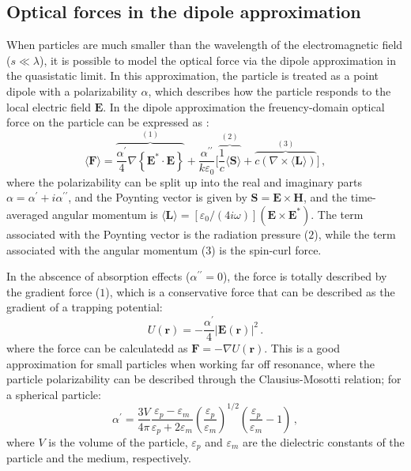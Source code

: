 \subsection*{Optical forces in the dipole approximation \cite{ownpub1}}

When particles are much smaller than the wavelength of the electromagnetic field ($s\ll \lambda$), it is possible to model the optical force via the dipole approximation in the
quasistatic limit. In this approximation, the particle is treated as a point dipole with a polarizability $\alpha$, which describes how the particle responds to the local electric field $\mathbf{E}$.
In the dipole approximation the freuency-domain optical force on the particle can be expressed as \cite{novotny}:
\begin{equation}
    \langle\mathbf{F}\rangle=\overbrace{\frac{\alpha^{\prime}}{4} \nabla\left\{\mathbf{E}^* \cdot \mathbf{E}\right\}}^{(1)}
    +\frac{\alpha^{\prime \prime}}{k \varepsilon_0} \Big[\overbrace{\frac{1}{c}\langle \mathbf{S} \rangle}^{(2)} + \overbrace{c \left( \nabla \times \langle \mathbf{L} \rangle \right)}^{(3)}\Big]\,,
\end{equation}
where the polarizability can be split up into the real and imaginary parts 
$\alpha=\alpha^\prime + i \alpha^{\prime \prime}$, and the Poynting vector is given by $\mathbf{S} = \mathbf{E} \times \mathbf{H}$, and the time-averaged angular momentum is 
$\langle \mathbf{L} \rangle = [\varepsilon_0/(4 i \omega)](\mathbf{E} \times \mathbf{E}^*)$. 
The term associated with the Poynting vector is the radiation pressure ($2$), while the term associated 
with the angular momentum ($3$) is the spin-curl force.

In the abscence of absorption effects ($\alpha^{\prime \prime}=0$), the force is totally described 
by the gradient force ($1$), which is a conservative force that can be described as the gradient 
of a trapping potential:
\begin{equation*}
    U (\mathbf{r}) = -\frac{\alpha^{\prime}}{4} \left|\mathbf{E}(\mathbf{r})\right|^2\,.
\end{equation*}
where the force can be calculatedd as $\mathbf{F} = -\nabla U(\mathbf{r})$. 
This is a good approximation for small particles
when working far off resonance, where the particle polarizability can be 
described through the Clausius-Mosotti relation; for a spherical particle:
\begin{equation}
    \alpha^{\prime}=\frac{3 V}{4 \pi} \frac{\varepsilon_p-\varepsilon_m}{\varepsilon_p+2 \varepsilon_m} \left(\frac{\varepsilon_p}{\varepsilon_m}\right)^{1 / 2} \left(\frac{\varepsilon_p}{\varepsilon_m}-1\right)\,,
\end{equation}
where $V$ is the volume of the particle, $\varepsilon_p$ and $\varepsilon_m$ are the
dielectric constants of the particle and the medium, respectively.

